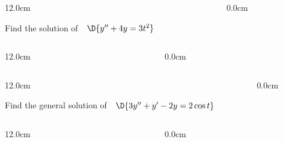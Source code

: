 \begin{frame}
\begin{columns}\begin{column}{12.0cm}

\scriptsize

\EX Find the solution of \,\, $\D{y''+4y = 3t^2}$

\vspace{9.2cm}

\end{column}\begin{column}{0.0cm}\end{column}\end{columns}
\end{frame}

\begin{frame}
\begin{columns}\begin{column}{12.0cm}

\scriptsize
	
\end{column}\begin{column}{0.0cm}\end{column}\end{columns}
\end{frame}

\begin{frame}
\begin{columns}\begin{column}{12.0cm}

\scriptsize

\EX Find the general solution of \,\, $\D{3y''+y'-2y=2\cos t}$

\vspace{9.2cm}

\end{column}\begin{column}{0.0cm}\end{column}\end{columns}
\end{frame}

\begin{frame}
\begin{columns}\begin{column}{12.0cm}

\scriptsize
	
\end{column}\begin{column}{0.0cm}\end{column}\end{columns}
\end{frame}

